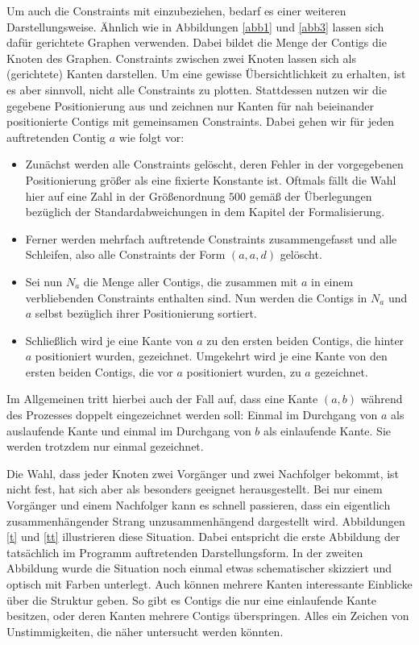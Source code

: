 Um auch die Constraints mit einzubeziehen, bedarf es einer weiteren Darstellungsweise.
Ähnlich wie in Abbildungen \ref{abb1} und \ref{abb3} lassen sich dafür gerichtete Graphen verwenden. Dabei bildet die Menge der Contigs die Knoten des Graphen. Constraints zwischen zwei Knoten lassen sich als (gerichtete) Kanten darstellen.
Um eine gewisse Übersichtlichkeit zu erhalten, ist es aber sinnvoll, nicht alle Constraints zu plotten.
Stattdessen nutzen wir die gegebene Positionierung aus und zeichnen nur Kanten für nah beieinander positionierte Contigs mit gemeinsamen Constraints.
Dabei gehen wir für jeden auftretenden Contig $a$ wie folgt vor:
\begin{itemize}
\item Zunächst werden alle Constraints gelöscht, deren Fehler in der vorgegebenen Positionierung größer als eine fixierte Konstante ist. Oftmals fällt die Wahl hier auf eine Zahl in der Größenordnung $500$ gemäß der Überlegungen bezüglich der Standardabweichungen in dem Kapitel der Formalisierung.
\item Ferner werden mehrfach auftretende Constraints zusammengefasst und alle Schleifen, also alle Constraints der Form $(a, a, d)$ gelöscht.
\item Sei nun $N_a$ die Menge aller Contigs, die zusammen mit $a$ in einem verbliebenden Constraints enthalten sind. Nun werden die Contigs in $N_a$ und $a$ selbst bezüglich ihrer Positionierung sortiert.
\item Schließlich wird je eine Kante von $a$ zu den ersten beiden Contigs, die hinter $a$ positioniert wurden, gezeichnet. Umgekehrt wird je eine Kante von den ersten beiden Contigs, die vor $a$ positioniert wurden, zu $a$ gezeichnet.
\end{itemize}
Im Allgemeinen tritt hierbei auch der Fall auf, dass eine Kante $(a,b)$ während des Prozesses doppelt eingezeichnet werden soll: Einmal im Durchgang von $a$ als auslaufende Kante und einmal im Durchgang von $b$ als einlaufende Kante.
Sie werden trotzdem nur einmal gezeichnet.

Die Wahl, dass jeder Knoten zwei Vorgänger und zwei Nachfolger bekommt, ist nicht fest, hat sich aber als besonders geeignet herausgestellt. Bei nur einem Vorgänger und einem Nachfolger kann es schnell passieren, dass ein eigentlich zusammenhängender Strang unzusammenhängend dargestellt wird. Abbildungen \ref{t} und \ref{tt} illustrieren diese Situation. Dabei entspricht die erste Abbildung der tatsächlich im Programm auftretenden Darstellungsform. In der zweiten Abbildung wurde die Situation noch einmal etwas schematischer skizziert und optisch mit Farben unterlegt. 
Auch können mehrere Kanten interessante Einblicke über die Struktur geben. So gibt es Contigs die nur eine einlaufende Kante besitzen, oder deren Kanten mehrere Contigs überspringen. Alles ein Zeichen von Unstimmigkeiten, die näher untersucht werden könnten.




